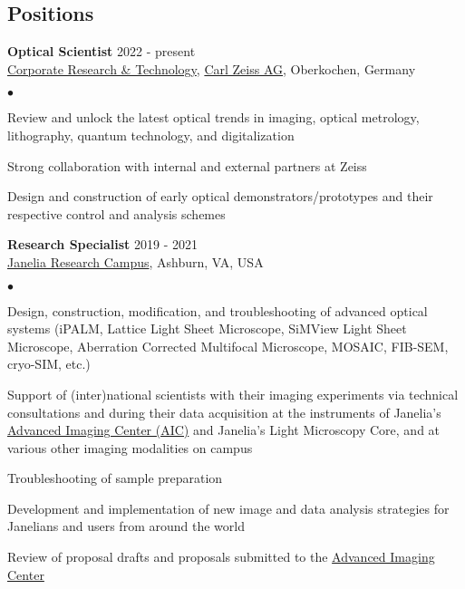 \documentclass[margin,line]{res}
\newenvironment{list2}{
  \begin{list}{$\bullet$}{%
      \setlength{\itemsep}{0in}
      \setlength{\parsep}{0in} \setlength{\parskip}{0in}
      \setlength{\topsep}{0in} \setlength{\partopsep}{0in} 
      \setlength{\leftmargin}{0.2in}}}{\end{list}}
\begin{document}
\begin{resume}

\section{\sc Positions}
{\bf Optical Scientist} \hfill {2022 - present}\\
\href{https://www.zeiss.com/corporate/int/careers/research-development-at-zeiss.html}{Corporate Research \& Technology}, \href{https://www.zeiss.de/}{Carl Zeiss AG}, Oberkochen, Germany\\
 \vspace*{-2mm}
\begin{list2}
\vspace*{-1mm}
\item Review and unlock the latest optical trends in imaging, optical metrology, lithography, quantum technology, and digitalization
\item Strong collaboration with internal and external partners at Zeiss
\item Design and construction of early optical demonstrators/prototypes and their respective control and analysis schemes
\end{list2}
{\bf Research Specialist} \hfill {2019 - 2021}\\
\href{https://www.janelia.org/}{Janelia Research Campus}, Ashburn, VA, USA\\
 \vspace*{-2mm}
\begin{list2}
\vspace*{-1mm}
\item Design, construction, modification, and troubleshooting of advanced optical systems (iPALM, Lattice Light Sheet Microscope, SiMView Light Sheet Microscope, Aberration Corrected Multifocal Microscope, MOSAIC, FIB-SEM, cryo-SIM, etc.)
\item Support of (inter)national scientists with their imaging experiments via technical consultations and during their data acquisition at the instruments of Janelia's \href{https://www.aicjanelia.org/}{Advanced Imaging Center (AIC)} and Janelia's Light Microscopy Core, and at various other imaging modalities on campus
\item Troubleshooting of sample preparation
\item Development and implementation of new image and data analysis strategies for Janelians and users from around the world
\item Review of proposal drafts and proposals submitted to the \href{https://www.aicjanelia.org/}{Advanced Imaging Center}

\end{list2}
\end{resume}
\end{document}
